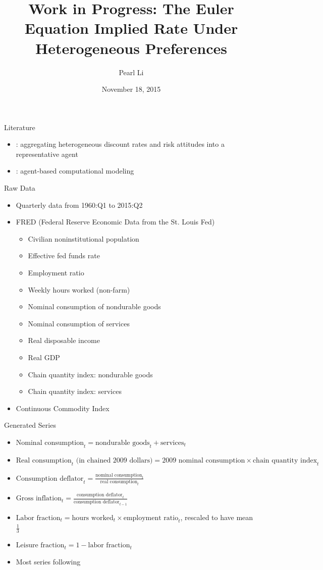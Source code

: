 \documentclass{beamer}
\title[Euler Equations]{Work in Progress: The Euler Equation Implied Rate Under Heterogeneous Preferences}
\author[Li]{Pearl Li}
\date{November 18, 2015}
\begin{document}
\begin{frame}
\titlepage
\end{frame}


\begin{frame}{Literature}
\begin{itemize}
\item \cite{hara09}: aggregating heterogeneous discount rates and risk attitudes into a representative agent
\item \cite{tesfatsion05}: agent-based computational modeling
\end{itemize}
\end{frame}

\begin{frame}{Raw Data}
\begin{itemize}
\item Quarterly data from 1960:Q1 to 2015:Q2 \bigskip
\item FRED (Federal Reserve Economic Data from the St. Louis Fed)
  \begin{itemize}
  \item Civilian noninstitutional population
  \item Effective fed funds rate
  \item Employment ratio
  \item Weekly hours worked (non-farm)
  \item Nominal consumption of nondurable goods
  \item Nominal consumption of services
  \item Real disposable income
  \item Real GDP
  \item Chain quantity index: nondurable goods
  \item Chain quantity index: services
  \end{itemize}
\item Continuous Commodity Index
\end{itemize}
\end{frame}

\begin{frame}{Generated Series}
\begin{itemize}
\item $\text{Nominal consumption}_t = \text{nondurable goods}_t + \text{services}_t$
\item $\text{Real consumption}_t \text{ (in chained 2009 dollars)} = \text{2009 nominal consumption} \times \text{chain quantity index}_t$
\item $\text{Consumption deflator}_t = \frac{\text{nominal consumption}_t}{\text{real consumption}_t}$
\item $\text{Gross inflation}_t = \frac{\text{consumption deflator}_t}{\text{consumption deflator}_{t-1}}$
\item $\text{Labor fraction}_t = \text{hours worked}_t \times \text{employment ratio}_t$, rescaled to have mean $\frac{1}{3}$
\item $\text{Leisure fraction}_t = 1 - \text{labor fraction}_t$ \bigskip\bigskip
\item Most series following \cite{collard11}
\end{itemize}
\end{frame}
\end{document}
